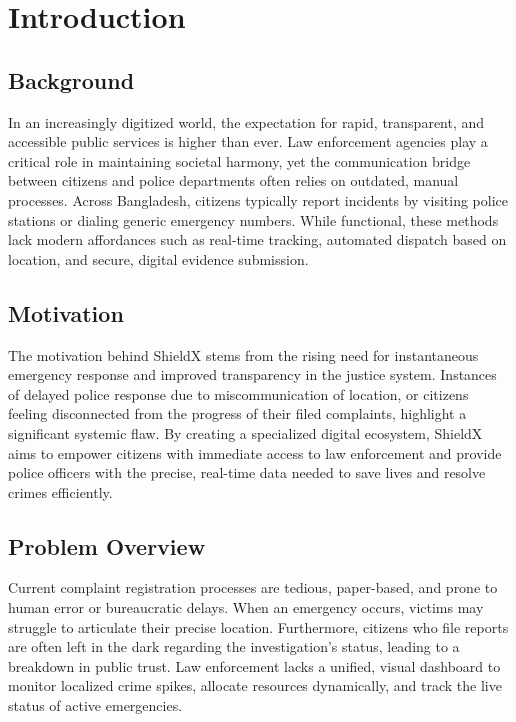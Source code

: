 \documentclass[12pt, a4paper, twoside]{report}
\begin{document}
\chapter{Introduction}
\section{Background}
In an increasingly digitized world, the expectation for rapid, transparent, and accessible public services is higher than ever. Law enforcement agencies play a critical role in maintaining societal harmony, yet the communication bridge between citizens and police departments often relies on outdated, manual processes. Across Bangladesh, citizens typically report incidents by visiting police stations or dialing generic emergency numbers. While functional, these methods lack modern affordances such as real-time tracking, automated dispatch based on location, and secure, digital evidence submission.
\section{Motivation}
The motivation behind ShieldX stems from the rising need for instantaneous emergency response and improved transparency in the justice system. Instances of delayed police response due to miscommunication of location, or citizens feeling disconnected from the progress of their filed complaints, highlight a significant systemic flaw. By creating a specialized digital ecosystem, ShieldX aims to empower citizens with immediate access to law enforcement and provide police officers with the precise, real-time data needed to save lives and resolve crimes efficiently.
\section{Problem Overview}
Current complaint registration processes are tedious, paper-based, and prone to human error or bureaucratic delays. When an emergency occurs, victims may struggle to articulate their precise location. Furthermore, citizens who file reports are often left in the dark regarding the investigation's status, leading to a breakdown in public trust. Law enforcement lacks a unified, visual dashboard to monitor localized crime spikes, allocate resources dynamically, and track the live status of active emergencies.
\end{document}
